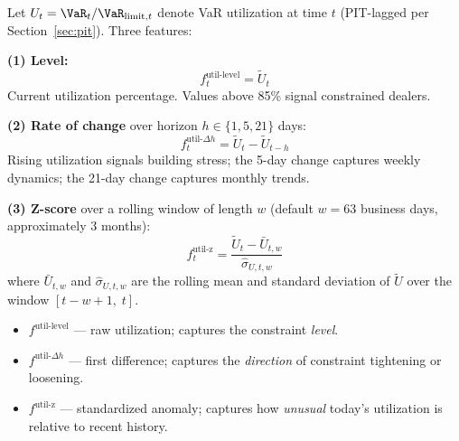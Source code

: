 Let $U_t = \VaR_t / \VaR_{\text{limit},t}$ denote VaR utilization at
time $t$ (PIT-lagged per Section~\ref{sec:pit}).  Three features:

\begin{definition}
\textbf{(1) Level:}
\begin{equation}
\label{eq:util-level}
f^{\text{util-level}}_t = \tilde{U}_t
\end{equation}
Current utilization percentage.  Values above 85\% signal constrained
dealers.

\textbf{(2) Rate of change} over horizon $h \in \{1, 5, 21\}$ days:
\begin{equation}
\label{eq:util-roc}
f^{\text{util-}\Delta h}_t = \tilde{U}_t - \tilde{U}_{t-h}
\end{equation}
Rising utilization signals building stress; the 5-day change captures
weekly dynamics; the 21-day change captures monthly trends.

\textbf{(3) Z-score} over a rolling window of length $w$ (default $w=63$
business days, approximately 3 months):
\begin{equation}
\label{eq:util-zscore}
f^{\text{util-z}}_t = \frac{\tilde{U}_t - \bar{U}_{t,w}}
  {\hat{\sigma}_{U,t,w}}
\end{equation}
where $\bar{U}_{t,w}$ and $\hat{\sigma}_{U,t,w}$ are the rolling mean
and standard deviation of $\tilde{U}$ over the window
$[t-w+1,\; t]$.

\begin{itemize}[nosep]
  \item $f^{\text{util-level}}$ --- raw utilization; captures the
        constraint \emph{level}.
  \item $f^{\text{util-}\Delta h}$ --- first difference; captures the
        \emph{direction} of constraint tightening or loosening.
  \item $f^{\text{util-z}}$ --- standardized anomaly; captures how
        \emph{unusual} today's utilization is relative to recent history.
\end{itemize}
\end{definition}

